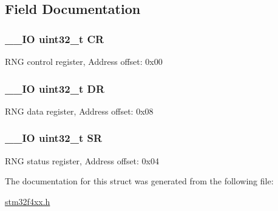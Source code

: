 \subsection{Field Documentation}
\hypertarget{struct_r_n_g___type_def_ab40c89c59391aaa9d9a8ec011dd0907a}{
\subsubsection[{C\-R}]{\setlength{\rightskip}{0pt plus 5cm}\-\_\-\-\_\-\-I\-O uint32\-\_\-t C\-R}}\label{struct_r_n_g___type_def_ab40c89c59391aaa9d9a8ec011dd0907a}
R\-N\-G control register, Address offset\-: 0x00 \hypertarget{struct_r_n_g___type_def_a3df0d8dfcd1ec958659ffe21eb64fa94}{
\subsubsection[{D\-R}]{\setlength{\rightskip}{0pt plus 5cm}\-\_\-\-\_\-\-I\-O uint32\-\_\-t D\-R}}\label{struct_r_n_g___type_def_a3df0d8dfcd1ec958659ffe21eb64fa94}
R\-N\-G data register, Address offset\-: 0x08 \hypertarget{struct_r_n_g___type_def_af6aca2bbd40c0fb6df7c3aebe224a360}{
\subsubsection[{S\-R}]{\setlength{\rightskip}{0pt plus 5cm}\-\_\-\-\_\-\-I\-O uint32\-\_\-t S\-R}}\label{struct_r_n_g___type_def_af6aca2bbd40c0fb6df7c3aebe224a360}
R\-N\-G status register, Address offset\-: 0x04 

The documentation for this struct was generated from the following file\-:\begin{DoxyCompactItemize}
\item 
\hyperlink{stm32f4xx_8h}{stm32f4xx.\-h}\end{DoxyCompactItemize}
